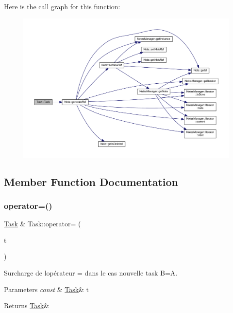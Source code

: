 Here is the call graph for this function\+:\nopagebreak
\begin{figure}[H]
\begin{center}
\leavevmode
\includegraphics[width=350pt]{class_task_a08a0f57803d8ef35f687f23f759e9f0c_cgraph}
\end{center}
\end{figure}


\subsection{Member Function Documentation}
\mbox{\label{class_task_a2430b942d050bf32c771821daa31493f}} 
\subsubsection{\texorpdfstring{operator=()}{operator=()}}
{\footnotesize\ttfamily \hyperlink{class_task}{Task} \& Task\+::operator= (\begin{DoxyParamCaption}\item[{const \hyperlink{class_task}{Task} \&}]{t }\end{DoxyParamCaption})}



Surcharge de l\textquotesingle{}opérateur = dans le cas nouvelle task B=A. 


\begin{DoxyParams}{Parameters}
{\em const} & \hyperlink{class_task}{Task}\& t \\
\hline
\end{DoxyParams}
\begin{DoxyReturn}{Returns}
\hyperlink{class_task}{Task}\& 
\end{DoxyReturn}


